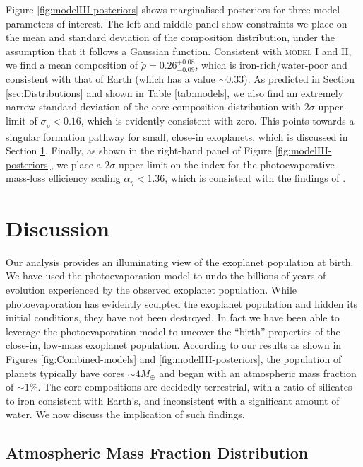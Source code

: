\documentclass[fleqn,usenatbib]{mnras}
\begin{document}
Figure \ref{fig:modelIII-posteriors} shows marginalised posteriors for three model parameters of interest. The left and middle panel show constraints we place on the mean and standard deviation of the composition distribution, under the assumption that it follows a Gaussian function. Consistent with \textsc{model I} and \textsc{II}, we find a mean composition of $\tilde{\rho} = 0.26^{+0.08}_{-0.09}$, which is iron-rich/water-poor and consistent with that of Earth (which has a value $\sim 0.33$). As predicted in Section \ref{sec:Distributions} and shown in Table \ref{tab:models}, we also find an extremely narrow standard deviation of the core composition distribution with $2\sigma$ upper-limit of $\sigma_{\tilde{\rho}} < 0.16$, which is evidently consistent with zero. This points towards a singular formation pathway for small, close-in exoplanets, which is discussed in Section \ref{sec:Discussion}. Finally, as shown in the right-hand panel of Figure \ref{fig:modelIII-posteriors}, we place a $2\sigma$ upper limit on the index for the photoevaporative mass-loss efficiency scaling $\alpha_\eta < 1.36$, which is consistent with the findings of \cite{Wu2019}.

\section{Discussion}\label{sec:Discussion}


Our analysis provides an illuminating view of the exoplanet population at birth. We have used the photoevaporation model to undo the billions of years of evolution experienced by the observed exoplanet population. While photoevaporation has evidently sculpted the exoplanet population and hidden its initial conditions, they have not been destroyed. In fact we have been able to leverage the photoevaporation model to uncover the ``birth'' properties of the close-in, low-mass exoplanet population. According to our results as shown in Figures \ref{fig:Combined-models} and \ref{fig:modelIII-posteriors}, the population of planets typically have cores $\sim 4M_\oplus$ and began with an atmospheric mass fraction of $\sim 1\%$. The core compositions are decidedly terrestrial, with a ratio of silicates to iron consistent with Earth's, and inconsistent with a significant amount of water. We now discuss the implication of such findings.


\subsection{Atmospheric Mass Fraction Distribution}
\end{document}
